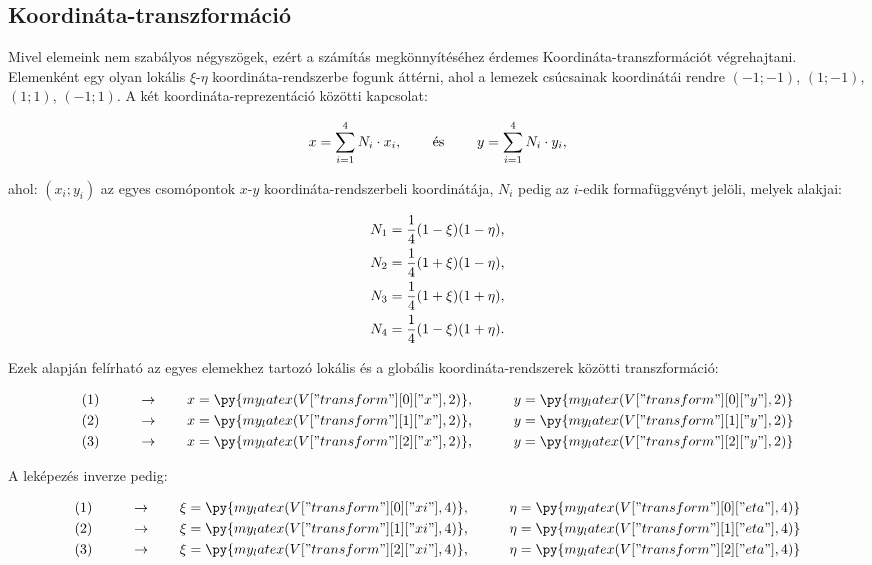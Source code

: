 \subsection{Koordináta-transzformáció}

Mivel elemeink nem szabályos négyszögek, ezért a számítás megkönnyítéséhez
érdemes Koordináta-transzformációt végrehajtani. Elemenként egy olyan lokális
$\xi$-$\eta$ koordináta-rendszerbe fogunk áttérni, ahol a lemezek csúcsainak
koordinátái rendre $(-1;-1)$, $(1;-1)$, $(1;1)$, $(-1;1)$. A két
koordináta-reprezentáció közötti kapcsolat:
\begin{myframe}
  \begin{equation}
    x = \sum_{i=1}^4 N_i \cdot x_i
    \text,
    \qquad
    \text{ és }
    \qquad
    y = \sum_{i=1}^4 N_i \cdot y_i
    \text,
  \end{equation}
\end{myframe}
ahol: $(x_i; y_i)$ az egyes csomópontok $x$-$y$ koordináta-rendszerbeli
koordinátája, $N_i$ pedig az $i$-edik formafüggvényt jelöli, melyek alakjai:
\begin{myframe}
  \begin{gather}
    N_1 = \frac{1}{4} (1 - \xi) (1 - \eta) \text, \\
    N_2 = \frac{1}{4} (1 + \xi) (1 - \eta) \text, \\
    N_3 = \frac{1}{4} (1 + \xi) (1 + \eta) \text, \\
    N_4 = \frac{1}{4} (1 - \xi) (1 + \eta) \text.
  \end{gather}
\end{myframe}
Ezek alapján felírható az egyes elemekhez tartozó lokális és a globális
koordináta-rendszerek közötti transzformáció:
\begin{myframe}
  \begin{alignat}{9}
     & (1) \qquad & \rightarrow \qquad x & = \py{my_latex(V["transform"][0]["x"],2)} \text, &  & \qquad y = \py{my_latex(V["transform"][0]["y"],2)}
    \\
     & (2) \qquad & \rightarrow \qquad x & = \py{my_latex(V["transform"][1]["x"],2)} \text, &  & \qquad y = \py{my_latex(V["transform"][1]["y"],2)}
    \\
     & (3) \qquad & \rightarrow \qquad x & = \py{my_latex(V["transform"][2]["x"],2)} \text, &  & \qquad y = \py{my_latex(V["transform"][2]["y"],2)}
  \end{alignat}
\end{myframe}
A leképezés inverze pedig:
\begin{myframe}
  \begin{alignat}{9}
     & (1) \qquad & \rightarrow \qquad \xi & = \py{my_latex(V["transform"][0]["xi"], 4)} \text, &  & \qquad \eta = \py{my_latex(V["transform"][0]["eta"], 4)}
    \\
     & (2) \qquad & \rightarrow \qquad \xi & = \py{my_latex(V["transform"][1]["xi"], 4)} \text, &  & \qquad \eta = \py{my_latex(V["transform"][1]["eta"], 4)}
    \label{eq:alma}
    \\
     & (3) \qquad & \rightarrow \qquad \xi & = \py{my_latex(V["transform"][2]["xi"], 4)} \text, &  & \qquad \eta = \py{my_latex(V["transform"][2]["eta"], 4)}
  \end{alignat}
\end{myframe}
